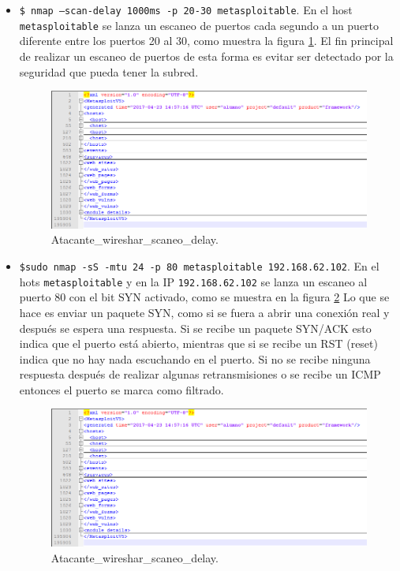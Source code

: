 \documentclass[a4,12pt,onecolum]{article}
\begin{document}
\begin{itemize}
  \item \texttt{\$ nmap —scan-delay 1000ms -p 20-30 metasploitable}. En el host \texttt{metasploitable} se lanza un escaneo de puertos cada segundo a un puerto diferente entre los puertos 20 al 30, como muestra la figura \ref{fig:nmap5}. El fin principal de realizar un escaneo de puertos de esta forma es evitar ser detectado por la seguridad que pueda tener la subred.

  \begin{figure}[htbp]
  \centering
  \includegraphics[width=1.0\textwidth]{./images/Atacante_scaner_y_BBDD.png}
  \caption{Atacante\_wireshar\_scaneo\_delay.}
  \label{fig:nmap5}
  \end{figure}

  \item \texttt{\$sudo nmap -sS -mtu 24 -p 80 metasploitable 192.168.62.102}. En el hots \texttt{metasploitable} y en la IP \texttt{192.168.62.102} se lanza un escaneo al puerto 80 con el bit SYN activado, como se muestra en la figura \ref{fig:nmap6} Lo que se hace es enviar un paquete SYN, como si se fuera a abrir una conexión real y después se espera una respuesta. Si se recibe un paquete SYN/ACK esto indica que el puerto está abierto, mientras que si se recibe un RST (reset) indica que no hay nada escuchando en el puerto. Si no se recibe ninguna respuesta después de realizar algunas retransmisiones o se recibe un ICMP entonces el puerto se marca como filtrado.

  \begin{figure}[htbp]
  \centering
  \includegraphics[width=1.0\textwidth]{./images/Atacante_scaner_y_BBDD.png}
  \caption{Atacante\_wireshar\_scaneo\_delay.}
  \label{fig:nmap6}
  \end{figure}
  

\end{itemize}
\end{document}
